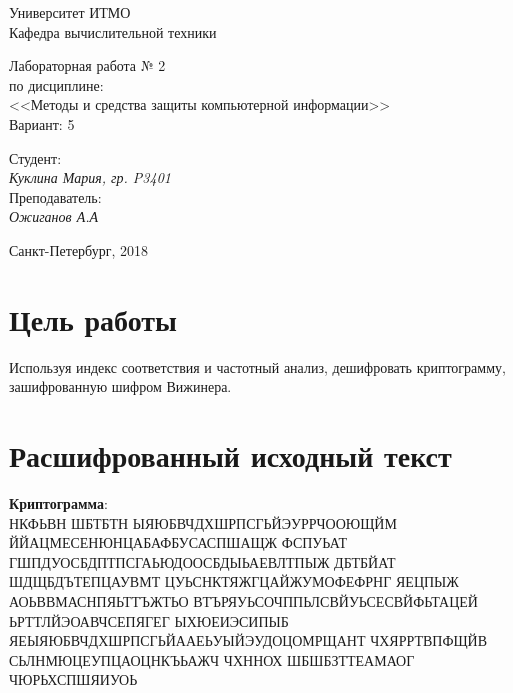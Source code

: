 \documentclass[12pt, a4paper] {ncc}
\begin{document}
\setcounter{figure}{0}
\frenchspacing
\pagestyle{empty}
\begin{center}
                            Университет ИТМО    \\
                        Кафедра вычислительной техники

						Лабораторная работа № 2 \\
				по дисциплине: \\
				<<Методы и средства защиты компьютерной информации>>\\
Вариант: 5
\end{center}
\begin{center}

\end{center}
\begin{flushright}
                                    Студент:\\
                                    {\it Куклина Мария, гр. P3401}\\
                                    Преподаватель: \\
                                    {\it Ожиганов А.А}
\end{flushright}
\begin{center}
                             Санкт-Петербург, 2018
\end{center}
\newpage

\section{Цель работы}

	Используя индекс соответствия и частотный анализ, дешифровать криптограмму, зашифрованную
	шифром Вижинера.


\section{Расшифрованный исходный текст}

\textbf{Криптограмма}: \\
НКФЬВН  ШБТБТН ЫЯЮБВЧДХШРПСГЬЙЭУРРЧООЮЩЙМ ЙЙАЦМЕСЕНЮНЦАБАФБУСАСПШАЩЖ ФСПУЬАТ ГШПДУОСБДПТПСГАЬЮДООСБДЫЬАЕВЛТПЫЖ ДБТБЙАТ  ШДЩБДЪТЕПЦАУВМТ ЦУЬСНКТЯЖГЦАЙЖУМОФЕФРНГ ЯЕЦПЫЖ АОЬВВМАСНПЯЬТТЪЖТЬО  ВТЪРЯУЬСОЧППЬЛСВЙУЬСЕСВЙФЬТАЦЕЙ ЬРТТЛЙЭОАВЧСЕПЯГЕГ ЫХЮЕИЭСИПЫБ ЯЕЫЯЮБВЧДХШРПСГЬЙААЕЬУЫЙЭУДОЦОМРЩАНТ ЧХЯРРТВПФЩЙВ СЬЛНМЮЦЕУПЦАОЦНКЪЬАЖЧ ЧХННОХ ШБШБЗТТЕАМАОГ ЧЮРЬХСПШЯИУОЬ
\end{document}
